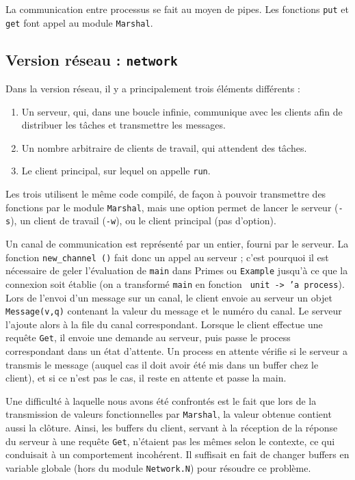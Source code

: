 \documentclass[11pt,a4paper]{article}
\renewcommand{\tt}[1]{\texttt{#1}}
\begin{document}
La communication entre processus se fait au moyen de pipes. Les fonctions
\tt{put} et \tt{get} font appel au module \tt{Marshal}. 

\subsection{Version réseau : \texttt{network}}

Dans la version réseau, il y a principalement trois éléments différents :
\begin{enumerate}

\item Un serveur, qui, dans une boucle infinie, communique avec les clients afin de
distribuer les tâches et transmettre les messages.
\item Un nombre arbitraire de clients de travail, qui attendent des tâches.
\item Le client principal, sur lequel on appelle \tt{run}.


\end{enumerate}

Les trois utilisent le même code compilé, de façon à pouvoir transmettre des
fonctions par le module \tt{Marshal}, mais une option permet de lancer le serveur
(\tt{-s}), un client de travail (\tt{-w}), ou le client principal (pas d'option).

Un canal de communication est représenté par un entier, fourni par le serveur.
La fonction \tt{new\_channel ()} fait donc un appel au serveur ; c'est pourquoi il
est nécessaire de geler l'évaluation de \tt{main} dans Primes ou \tt{Example} jusqu'à ce
que la connexion soit établie (on a transformé \tt{main} en fonction \tt{
unit -> 'a process}). Lors de l'envoi d'un message sur un canal, le client envoie
au serveur un objet \tt{Message(v,q)} contenant la valeur du message et le numéro du
canal. Le serveur l'ajoute alors à la file du canal correspondant. Lorsque le
client effectue une requête \tt{Get}, il envoie une demande au serveur, puis passe
le process correspondant dans un état d'attente. Un process en attente vérifie
si le serveur a transmis le message (auquel cas il doit avoir été mis dans un
buffer chez le client), et si ce n'est pas le cas, il reste en attente et
passe la main.

Une difficulté à laquelle nous avons été confrontés est le fait que lors de la
transmission de valeurs fonctionnelles par \tt{Marshal}, la valeur obtenue contient
aussi la clôture. Ainsi, les buffers du client, servant à la réception de la
réponse du serveur à une requête \tt{Get}, n'étaient pas les mêmes selon le contexte,
ce qui conduisait à un comportement incohérent. Il suffisait en fait de changer
buffers en variable globale (hors du module \tt{Network.N}) pour résoudre ce
problème.
\end{document}
